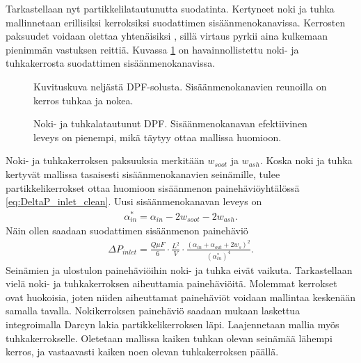 Tarkastellaan nyt partikkelilatautunutta suodatinta.
Kertyneet noki ja tuhka mallinnetaan erillisiksi kerroksiksi suodattimen sisäänmenokanavissa. Kerrosten paksuudet voidaan  olettaa yhtenäisiksi \cite{Konstandopoulos2000}, sillä virtaus pyrkii aina kulkemaan pienimmän vastuksen reittiä. Kuvassa \ref{fig:hac_dpf_loaded} on havainnollistettu noki- ja tuhkakerrosta suodattimen sisäänmenokanavissa.
\begin{figure}[H]
    \centering 
               {Kuvituskuva neljästä DPF-solusta. Sisäänmenokanavien reunoilla on kerros tuhkaa ja nokea.}
    \caption{Noki- ja tuhkalatautunut DPF. Sisäänmenokanavan efektiivinen leveys on pienempi, mikä täytyy ottaa mallissa huomioon.}
    \label{fig:hac_dpf_loaded}
\end{figure}
Noki- ja tuhkakerroksen paksuuksia merkitään \(w_{soot}\) ja \(w_{ash}\).
Koska noki ja tuhka kertyvät mallissa tasaisesti sisäänmenokanavien seinämille, tulee partikkelikerrokset ottaa huomioon sisäänmenon painehäviöyhtälössä \eqref{eq:DeltaP_inlet_clean}. Uusi sisäänmenokanavan leveys on 
\begin{align}
    \alpha_{in}^* = \alpha_{in} -2w_{soot}-2w_{ash}.
\end{align}
Näin ollen saadaan suodattimen sisäänmenon painehäviö
\begin{align}
    \Delta P_{inlet} = \frac{Q \mu F}{6}\cdot \frac{L^2}{V} \cdot \frac{(\alpha_{in}+\alpha_{out}+2 w_s)^2}{(\alpha_{in}^*)^4}.
    \label{eq:PDinletchannel}
\end{align}
Seinämien ja ulostulon painehäviöihin noki- ja tuhka eivät vaikuta. 
Tarkastellaan vielä noki- ja tuhkakerroksen aiheuttamia painehäviöitä. Molemmat kerrokset ovat huokoisia, joten niiden aiheuttamat painehäviöt voidaan mallintaa keskenään samalla tavalla. Nokikerroksen painehäviö saadaan \cite{Konstandopoulos2000} mukaan laskettua integroimalla Darcyn lakia partikkelikerroksen läpi. Laajennetaan mallia myös tuhkakerrokselle. Oletetaan mallissa kaiken tuhkan olevan seinämää lähempi kerros, ja vastaavasti kaiken noen olevan tuhkakerroksen päällä.
